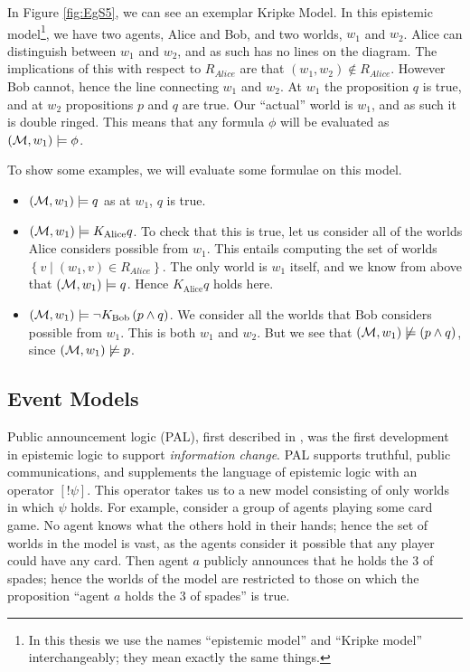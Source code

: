\documentclass[ %
                    author={Leo Poulson},
                supervisor={Dr. Steven Ramsay},
                    degree={BSc},
                     title={Epistemic Planning for the Dynamic Gossip problem},
                  subtitle={},
                      year={2019} ]{dissertation}
\begin{document}
In Figure \ref{fig:EgS5}, we can see an exemplar Kripke Model. In this epistemic
model\footnote{In this thesis we use the names ``epistemic model'' and ``Kripke
  model'' interchangeably; they mean exactly the same things.}, we have two
agents, Alice and Bob, and two worlds, $w_1$ and $w_2$. Alice can distinguish
between $w_1$ and $w_2$, and as such has no lines on the diagram. The
implications of this with respect to $R_{Alice}$ are that $(w_1, w_2) \not \in
R_{Alice}$. However Bob cannot, hence the line connecting $w_1$ and $w_2$. At
$w_1$ the proposition $q$ is true, and at $w_2$ propositions $p$ and $q$ are
true. Our ``actual'' world is $w_1$, and as such it is double ringed. This means
that any formula $\phi$ will be evaluated as $(\mathcal{M}, w_1) \models \phi$.

To show some examples, we will evaluate some formulae on this model.

\begin{itemize}
\item $(\mathcal{M}, w_1) \models q$ as at $w_1$, $q$ is true.
\item $(\mathcal{M}, w_1) \models K_{\text{Alice}} q$. To check that this is true,
  let us consider all of the worlds Alice considers possible from $w_1$. This
  entails computing the set of worlds $\left\{ v \mid (w_1, v) \in R_{Alice}
  \right\}$. The only world is $w_1$ itself, and we know from above that
  $(\mathcal{M}, w_1) \models q$. Hence $K_{\text{Alice}} q$ holds here.
\item $(\mathcal{M}, w_1) \models \neg K_{\text{Bob}} \left( p \land q \right)$. We
  consider all the worlds that Bob considers possible from $w_1$. This is both
  $w_1$ and $w_2$. But we see that $(\mathcal{M}, w_1) \not \models (p \land q)$,
  since $(\mathcal{M}, w_1) \not \models p$.
\end{itemize}

\subsection{Event Models}
\label{sec:Event Models}

Public announcement logic (PAL), first described in \cite{PAL}, was the first
development in epistemic logic to support \emph{information change}. PAL
supports truthful, public communications, and supplements the language of
epistemic logic with an operator $[!\psi]$. This operator takes us to a new
model consisting of only worlds in which $\psi$ holds. For example, consider a
group of agents playing some card game. No agent knows what the others hold in
their hands; hence the set of worlds in the model is vast, as the agents
consider it possible that any player could have any card. Then agent $a$
publicly announces that he holds the 3 of spades; hence the worlds of the model
are restricted to those on which the proposition ``agent $a$ holds the 3 of
spades'' is true.
\end{document}
